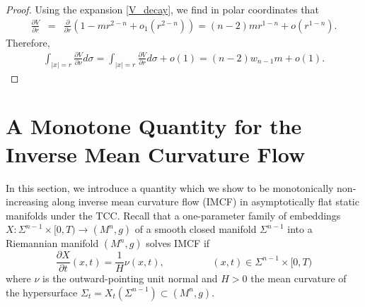 \documentclass[12pt]{amsart}
\theoremstyle{definition}
\numberwithin{equation}{section}
\begin{document}
\begin{proof}



Using the expansion \eqref{V_decay}, we find in polar coordinates that
\begin{eqnarray*}
    \frac{\partial V}{\partial r} &=& \frac{\partial}{\partial r} \left( 1 - m r^{2-n} + o_{1}(r^{2-n}) \right) = (n-2) m r^{1-n} + o(r^{1-n}). 
\end{eqnarray*}
Therefore,
\begin{eqnarray*}
    \int_{|x| = r } \frac{\partial V}{\partial \nu} d\sigma = \int_{|x|=r} \frac{\partial V}{\partial r} d\sigma + o(1)= (n-2)w_{n-1} m + o(1).
\end{eqnarray*}
\end{proof}

\section{A Monotone Quantity for the Inverse Mean Curvature Flow}
In this section, we introduce a quantity which we show to be monotonically non-increasing along inverse mean curvature flow (IMCF) in asymptotically flat static manifolds under the TCC. Recall that a one-parameter family of embeddings $X: \Sigma^{n-1} \times [0,T) \rightarrow (M^{n},g)$ of a smooth closed manifold $\Sigma^{n-1}$ into a Riemannian manifold $(M^{n},g)$ solves IMCF if
\begin{equation} \label{IMCF}
\frac{\partial X}{\partial t} (x,t) = \frac{1}{H} \nu(x,t),    \hspace{2cm} (x,t) \in \Sigma^{n-1} \times [0,T)
\end{equation}
where $\nu$ is the outward-pointing unit normal and $H>0$ the mean curvature of the hypersurface $\Sigma_{t}=X_{t}(\Sigma^{n-1}) \subset (M^{n},g)$. 
\end{document}
